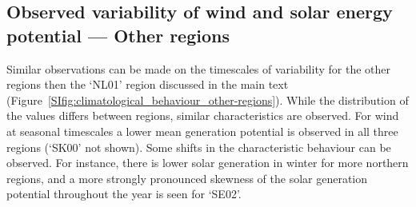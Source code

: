 \documentclass[12pt]{iopart}
\begin{document}
\subsection{Observed variability of wind and solar energy potential --- Other regions}
Similar observations can be made on the timescales of variability for the other regions then the `NL01' region discussed in the main text (Figure~\ref{SIfig:climatological_behaviour_other-regions}). 
While the distribution of the values differs between regions, similar characteristics are observed. 
For wind at seasonal timescales a lower mean generation potential is observed in all three regions (`SK00' not shown). 
Some shifts in the characteristic behaviour can be observed. 
For instance, there is lower solar generation in winter for more northern regions, and a more strongly pronounced skewness of the solar generation potential throughout the year is seen for `SE02'. 
\end{document}
